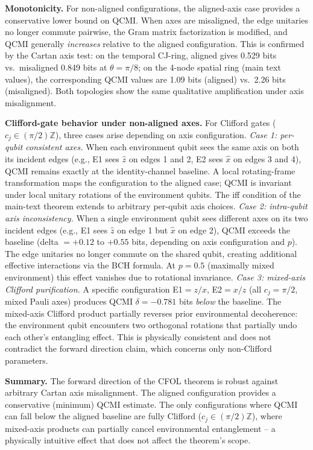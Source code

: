 \documentclass[aps,prl,superscriptaddress,nofootinbib]{revtex4-2}
\begin{document}
\textbf{Monotonicity.} For non-aligned configurations, the aligned-axis case provides a conservative lower bound on QCMI. When axes are misaligned, the edge unitaries no longer commute pairwise, the Gram matrix factorization is modified, and QCMI generally \textit{increases} relative to the aligned configuration. This is confirmed by the Cartan axis test: on the temporal CJ-ring, aligned gives 0.529 bits vs.\ misaligned 0.849 bits at $\theta=\pi/8$; on the 4-node spatial ring (main text values), the corresponding QCMI values are 1.09 bits (aligned) vs.\ 2.26 bits (misaligned). Both topologies show the same qualitative amplification under axis misalignment.

\textbf{Clifford-gate behavior under non-aligned axes.} For Clifford gates ($c_j \in (\pi/2)\mathbb{Z}$), three cases arise depending on axis configuration. \textit{Case 1: per-qubit consistent axes.} When each environment qubit sees the same axis on both its incident edges (e.g., E1 sees $\hat{z}$ on edges 1 and 2, E2 sees $\hat{x}$ on edges 3 and 4), QCMI remains exactly at the identity-channel baseline. A local rotating-frame transformation maps the configuration to the aligned case; QCMI is invariant under local unitary rotations of the environment qubits. The iff condition of the main-text theorem extends to arbitrary per-qubit axis choices. \textit{Case 2: intra-qubit axis inconsistency.} When a single environment qubit sees different axes on its two incident edges (e.g., E1 sees $\hat{z}$ on edge 1 but $\hat{x}$ on edge 2), QCMI exceeds the baseline (delta $= +0.12$ to $+0.55$ bits, depending on axis configuration and $p$). The edge unitaries no longer commute on the shared qubit, creating additional effective interactions via the BCH formula. At $p=0.5$ (maximally mixed environment) this effect vanishes due to rotational invariance. \textit{Case 3: mixed-axis Clifford purification.} A specific configuration E1$=z/x$, E2$=x/z$ (all $c_j=\pi/2$, mixed Pauli axes) produces QCMI $\delta = -0.781$ bits \textit{below} the baseline. The mixed-axis Clifford product partially reverses prior environmental decoherence: the environment qubit encounters two orthogonal rotations that partially undo each other's entangling effect. This is physically consistent and does not contradict the forward direction claim, which concerns only non-Clifford parameters.

\textbf{Summary.} The forward direction of the CFOL theorem is robust against arbitrary Cartan axis misalignment. The aligned configuration provides a conservative (minimum) QCMI estimate. The only configurations where QCMI can fall below the aligned baseline are fully Clifford ($c_j \in (\pi/2)\mathbb{Z}$), where mixed-axis products can partially cancel environmental entanglement -- a physically intuitive effect that does not affect the theorem's scope.
\end{document}
